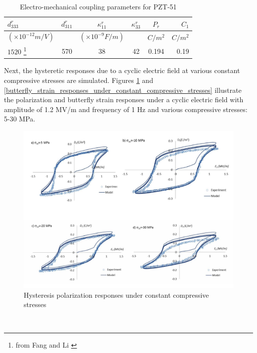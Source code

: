 \begin{table}
\caption{Electro-mechanical coupling parameters for PZT-51}
\centering
\begin{tabular}{l c c c c r}
\hline 
$d^r_{333}$ & $d^r_{311}$& $\kappa^r_{11}$&$\kappa^r_{33}$ & $P_r$& $C_1$ \\  \hline
$(\times 10^{-12} m/V)$ & & $(\times 10^{-9} F/m)$ &  & $C/m^2$& $C/m^2$ \\ 
$1520$ \footnote{ from Fang and Li \cite{raey}} & 570 & 38 & 42 & 0.194 & 0.19 \\  \hline
\end{tabular}
\label{table:MatPZT_51_Electro_mechanical_coupling}
\end{table}

Next, the hysteretic responses due to a cyclic electric field at various constant compressive stresses are simulated. 
Figures \ref{hysteresis_polarization_responses_under_constant_compressive_stresses} and \ref{butterfly_strain_responses_under_constant_compressive_stresses} illustrate the polarization and butterfly strain responses under a cyclic electric field with amplitude of 1.2 MV/m and frequency of 1 Hz and various compressive stresses: 5-30 MPa. 
\begin{figure} 
\centering 
\includegraphics[width=6.0in]{./chap_2_pol_sw/figures/hysteresis_polarization_responses_under_constant_compressive_stresses.pdf} 
\caption{Hysteresis polarization responses under constant compressive stresses}
\label{hysteresis_polarization_responses_under_constant_compressive_stresses}
\end{figure}
\\

